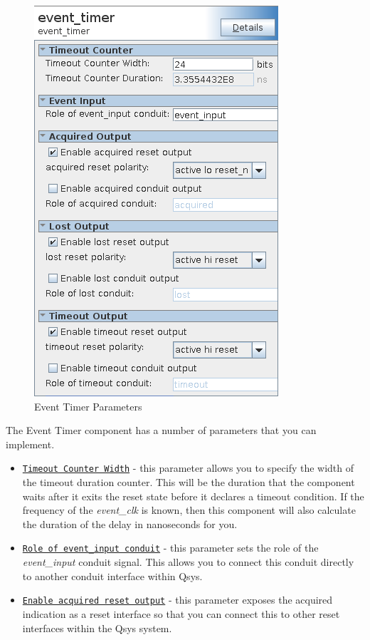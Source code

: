 \documentclass{article}
\begin{document}
\begin{flushleft}
\begin{figure}[H]
\centering
\includegraphics[scale=0.675]{et_parameters}
\caption{Event Timer Parameters}
\label{fig:et_parameters}
\end{figure}

The Event Timer component has a number of parameters that you can implement.
\begin{itemize}

\item \texttt{\underline{Timeout Counter Width}} - this parameter allows you to specify the width of the timeout duration counter.  This will be the duration that the component waits after it exits the reset state before it declares a timeout condition.  If the frequency of the \emph{event\_clk} is known, then this component will also calculate the duration of the delay in nanoseconds for you.

\item \texttt{\underline{Role of event\_input conduit}} - this parameter sets the role of the \emph{event\_input} conduit signal.  This allows you to connect this conduit directly to another conduit interface within Qsys.

\item \texttt{\underline{Enable acquired reset output}} - this parameter exposes the acquired indication as a reset interface so that you can connect this to other reset interfaces within the Qsys system.


\end{itemize}
\end{flushleft}
\end{document}
